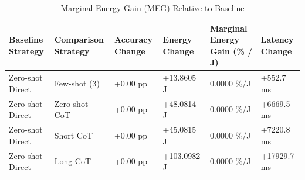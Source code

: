 \begin{table}
\caption{Marginal Energy Gain (MEG) Relative to Baseline}
\label{tab:marginal_energy_gain}
\begin{tabular}{llllll}
\toprule
Baseline Strategy & Comparison Strategy & Accuracy Change & Energy Change & Marginal Energy Gain (\% / J) & Latency Change \\
\midrule
Zero-shot Direct & Few-shot (3) & +0.00 pp & +13.8605 J & 0.0000 \%/J & +552.7 ms \\
Zero-shot Direct & Zero-shot CoT & +0.00 pp & +48.0814 J & 0.0000 \%/J & +6669.5 ms \\
Zero-shot Direct & Short CoT & +0.00 pp & +45.0815 J & 0.0000 \%/J & +7220.8 ms \\
Zero-shot Direct & Long CoT & +0.00 pp & +103.0982 J & 0.0000 \%/J & +17929.7 ms \\
\bottomrule
\end{tabular}
\end{table}
